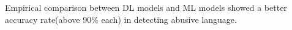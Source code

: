 Empirical comparison between DL models and ML models showed a better accuracy rate(above 90\% each) in detecting abusive language.
